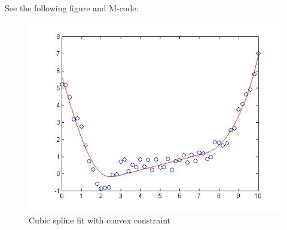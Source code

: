 \paragraph{}
See the following figure and M-code:
\begin{figure}[h]
	\centering
	\includegraphics[scale=0.5]{cubicfit}
	\caption{Cubic spline fit with convex constraint}
\end{figure}



